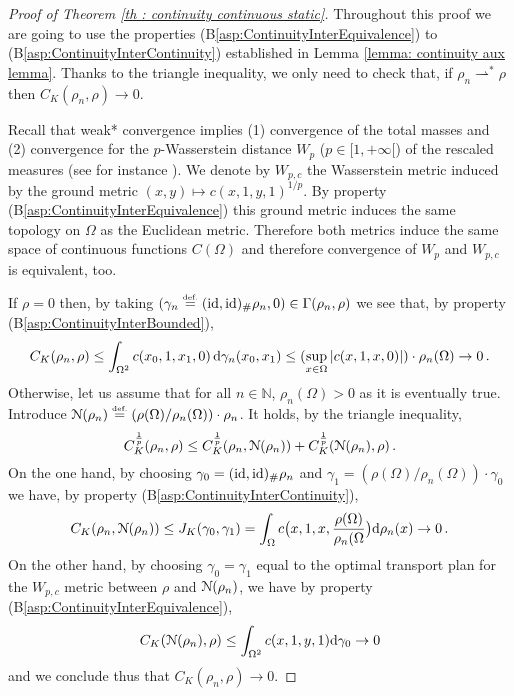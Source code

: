 \begin{proof}[Proof of Theorem \ref{th : continuity continuous static}]
Throughout this proof we are going to use the properties (B\ref{asp:ContinuityInterEquivalence}) to (B\ref{asp:ContinuityInterContinuity}) established in Lemma \ref{lemma: continuity aux lemma}.
Thanks to the triangle inequality, we only need to check that, if $\rho_n \rightharpoonup^* \rho$ then $C_K(\rho_n,\rho) \allowbreak \to 0$.

Recall that weak* convergence implies (1) convergence of the total masses and (2) convergence for the $p$-Wasserstein distance $W_p$ ($p\in [1,+\infty[$) of the rescaled measures (see for instance \cite[Theorem 7.12]{cedric2003topics}). We denote by $W_{p,c}$ the Wasserstein metric induced by the ground metric $(x,y) \mapsto c(x,1,y,1)^{1/p}$. By property (B\ref{asp:ContinuityInterEquivalence}) this ground metric induces the same topology on $\Omega$ as the Euclidean metric. Therefore both metrics induce the same space of continuous functions $C(\Omega)$ and therefore convergence of $W_p$ and $W_{p,c}$ is equivalent, too.

If $\rho = 0$ then, by taking $(\gamma_n \stackrel{\mbox{\upshape\tiny def.}}{=} (\operatorname{id},\operatorname{id})_{\#} \rho_n, 0) \in \Gamma(\rho_n, \rho)$ we see that, by property (B\ref{asp:ContinuityInterBounded}),
\[
C_K(\rho_n, \rho) \leq \int_{\Omega^2} c(x_0,1,x_1,0)\, \mathrm{d} \gamma_n(x_0,x_1) \leq (\sup_{x \in \Omega} |c(x,1, x,0) |) \cdot \rho_n(\Omega) \to 0 \, .
\]
Otherwise, let us assume that for all $n\in \mathbb{N}$, $\rho_n(\Omega)>0$ as it is eventually true. Introduce $\mathcal{N}(\rho_n) \stackrel{\mbox{\upshape\tiny def.}}{=} (\rho(\Omega)/\rho_n(\Omega)) \cdot \rho_n$. It holds, by the triangle inequality,
\[
C_K^\frac1p (\rho_n,\rho) \leq C_K^\frac1p (\rho_n,\mathcal{N}(\rho_n)) + C_K^\frac1p (\mathcal{N}(\rho_n),\rho)\, .
\]
On the one hand, by choosing $\gamma_0 = (\operatorname{id},\operatorname{id})_{\#} \rho_n$ and  $\gamma_1 = (\rho(\Omega)/\rho_n(\Omega)) \cdot \gamma_0$ we have, by property (B\ref{asp:ContinuityInterContinuity}),
\begin{align*}
C_K(\rho_n,\mathcal{N}(\rho_n)) \leq J_K(\gamma_0,\gamma_1) = \int_{\Omega} c\big(x,1,x,\frac{\rho(\Omega)}{\rho_n(\Omega}\big) \mathrm{d} \rho_n(x) \to 0 \, .
\end{align*}
On the other hand, by choosing $\gamma_0 = \gamma_1$ equal to the optimal transport plan for the $W_{p,c}$ metric between $\rho$ and $\mathcal{N}(\rho_n)$, we have by property (B\ref{asp:ContinuityInterEquivalence}),
\[
C_K(\mathcal{N}(\rho_n),\rho)
 \leq \int_{\Omega^2} c(x,1,y,1) \mathrm{d} \gamma_0
 \to 0
\]
and we conclude thus that $C_K(\rho_n,\rho)  \to 0$.
\end{proof}


